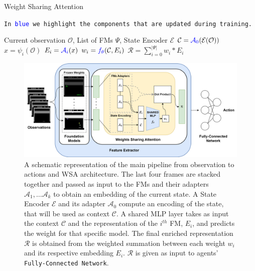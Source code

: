 \begin{algorithm}[ht]
    \caption{Weight Sharing Attention}\label{alg:wsa}
    \texttt{In \textcolor{blue}{blue} we highlight the components that are updated during training.}\\
    \begin{algorithmic}[1]
        \Require Current observation $\mathcal{O}$, List of FMs $\Psi$, State Encoder $\mathcal{E}$
        \State $\mathcal{C} = \textcolor{blue}{\mathcal{A}_0}(\mathcal{E}(\mathcal{O}))$ 
            \State $x = \psi_i(\mathcal{O})$ 
            \State $E_i = \textcolor{blue}{\mathcal{A}_i}(x)$ 
            \State $w_i = \textcolor{blue}{f_\theta}(\mathcal{C}, E_i)$ 
        \EndFor
        \State $\mathcal{R} = \sum_{i=0}^{|\Psi|} w_i * E_i$ 
    \end{algorithmic}
\end{algorithm}



\begin{figure}[ht]
    \begin{center}
        \includegraphics[width=1\textwidth]{images/main_architecture2}
    \end{center}
    \caption{A schematic representation of the main pipeline from observation to actions and WSA architecture. The last four frames are stacked together and passed as input to the FMs and their adapters $\mathcal{A}_1, \dots \mathcal{A}_k$ to obtain an embedding of the current state. A State Encoder $\mathcal{E}$ and its adapter $\mathcal{A}_0$ compute an encoding of the state, that will be used as context $\mathcal{C}$. A shared MLP layer takes as input the context $\mathcal{C}$ and the representation of the $i^{th}$ FM, $E_i$, and predicts the weight for that specific model. The final enriched representation $\mathcal{R}$ is obtained from the weighted summation between each weight $w_i$ and its respective embedding $E_i$. $\mathcal{R}$ is given as input to agents' \texttt{Fully-Connected Network}.}
    \label{fig:main_architecture}
\end{figure}


